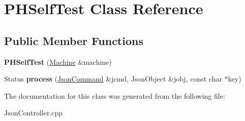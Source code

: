 \hypertarget{class_p_h_self_test}{\section{P\+H\+Self\+Test Class Reference}
\label{class_p_h_self_test}
}
\subsection*{Public Member Functions}
\begin{DoxyCompactItemize}
\item 
\hypertarget{class_p_h_self_test_a2b35b015c8453d513259249b2e14e779}{{\bfseries P\+H\+Self\+Test} (\hyperlink{classfirestep_1_1_machine}{Machine} \&machine)}\label{class_p_h_self_test_a2b35b015c8453d513259249b2e14e779}

\item 
\hypertarget{class_p_h_self_test_a6ad22cb23f5d4d9e782079b6bc81f873}{Status {\bfseries process} (\hyperlink{classfirestep_1_1_json_command}{Json\+Command} \&jcmd, Json\+Object \&jobj, const char $\ast$key)}\label{class_p_h_self_test_a6ad22cb23f5d4d9e782079b6bc81f873}

\end{DoxyCompactItemize}


The documentation for this class was generated from the following file\+:\begin{DoxyCompactItemize}
\item 
Json\+Controller.\+cpp\end{DoxyCompactItemize}
